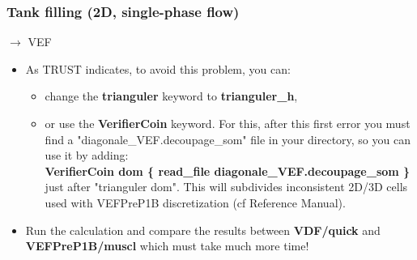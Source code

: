 \documentclass[10pt, hyperref={unicode=true,pdfusetitle, bookmarks=true,bookmarksnumbered=false,bookmarksopen=false, breaklinks=false,pdfborder={0 0l 1},backref=true,colorlinks=true,linkcolor=darkblue,pageanchor}]{beamer}
\begin{document}
\begin{frame}
\frametitle{Tank filling (2D, single-phase flow)}
\begin{block}{$\rightarrow$ VEF}

\begin{itemize}
\item As TRUST indicates, to avoid this problem, you can:
    \begin{itemize}
    \item [$\circ$] change the \textbf{trianguler} keyword to \textbf{trianguler\_h}, 
    \item [$\circ$] or use the \textbf{VerifierCoin} keyword. For this, after this first error you must find a "diagonale\_VEF.decoupage\_som" file in your directory, so you can use it by adding:\\
    \textbf{VerifierCoin dom \{ read\_file diagonale\_VEF.decoupage\_som \} }\\
    just after "trianguler dom". This will subdivides inconsistent 2D/3D cells used with VEFPreP1B discretization (cf Reference Manual).
    \end{itemize}

\item Run the calculation and compare the results between \textbf{VDF/quick} and \textbf{VEFPreP1B/muscl} which must take much more time!
\end{itemize}

\end{block}
\end{frame}
\end{document}

